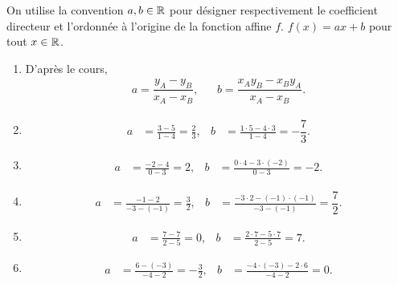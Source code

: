 {
	On utilise la convention $a, b \in \mathbb{R}$ pour désigner respectivement le coefficient directeur et l'ordonnée à l'origine de la fonction affine $f$.
	$f(x) = ax+b$ pour tout $x\in\mathbb{R}$.

	\begin{enumerate}
		\item 
			D'après le cours,
			\begin{align*}
				a = \dfrac{y_A - y_B}{x_A - x_B}, && b = \dfrac{x_A y_B - x_B y_A}{x_A - x_B}.
			\end{align*}
		 \item 
		    \begin{align*}
		        a &= \frac{3-5}{1-4} = \frac{2}{3}, & b &= \frac{1 \cdot 5 - 4 \cdot 3}{1 - 4} = -\dfrac73.
		    \end{align*}
		
		    \item 
		    \begin{align*}
		        a &= \frac{-2 - 4}{0-3} = 2, & b &= \frac{0 \cdot 4 - 3 \cdot (-2)}{0 - 3} = -2.
		    \end{align*}
		    
		    \item
		    \begin{align*}
		        a &= \frac{-1 - 2}{-3 - (-1)} = \frac{3}{2}, & b &= \frac{-3 \cdot 2 - (-1) \cdot (-1)}{-3 - (-1)} = \dfrac72.
		    \end{align*}
		
		    \item
		    \begin{align*}
		        a &= \frac{7 - 7}{2 - 5} = 0, & b &= \frac{2 \cdot 7 - 5 \cdot 7}{2 - 5} = 7.
		    \end{align*}
		
		    \item
		    \begin{align*}
		        a &= \frac{6-(-3)}{-4 - 2} = -\frac{3}{2}, & b &= \frac{-4 \cdot (-3) - 2 \cdot 6}{-4 - 2} = 0.
		    \end{align*}

	\end{enumerate}


}

